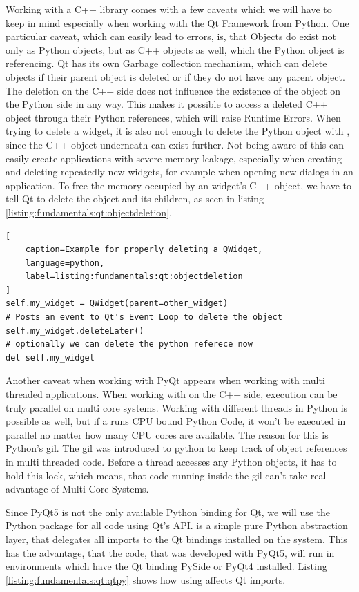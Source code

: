 Working with a C++ library comes with a few caveats which we will have to keep
in mind especially when working with the Qt Framework from Python. One
particular caveat, which can easily lead to errors, is, that Objects do exist
not only as Python objects, but as C++ objects as well, which the Python object
is referencing. Qt has its own Garbage collection mechanism, which can delete
objects if their parent object is deleted or if they do not have any parent
object. The deletion on the C++ side does not influence the existence of the
object on the Python side in any way. This makes it possible to access a deleted
C++ object through their Python references, which will raise Runtime Errors.
When trying to delete a widget, it is also not enough to delete the Python
object with , since the C++ object
underneath can exist further. Not being aware of this can easily create
applications with severe memory leakage, especially when creating and deleting
repeatedly new widgets, for example when opening new dialogs in an application.
To free the memory occupied by an widget's C++ object, we have to tell Qt to
delete the object and its children, as seen in listing
\ref{listing:fundamentals:qt:objectdeletion}.

\begin{lstlisting}[
    caption=Example for properly deleting a QWidget,
    language=python, 
    label=listing:fundamentals:qt:objectdeletion
]
self.my_widget = QWidget(parent=other_widget)
# Posts an event to Qt's Event Loop to delete the object
self.my_widget.deleteLater()
# optionally we can delete the python referece now
del self.my_widget
\end{lstlisting}

Another caveat when working with PyQt appears when working with multi threaded
applications. When working with  on the C++
side, execution can be truly parallel on multi core systems. Working with
different threads in Python is possible as well, but if a
 runs CPU bound Python Code, it won't be
executed in parallel no matter how many CPU cores are available. The reason for
this is Python's \gls{gil}. The \gls{gil} was introduced to python to keep track
of object references in multi threaded code. Before a thread accesses any Python
objects, it has to hold this lock, which means, that code running inside the
\gls{gil} can't take real advantage of Multi Core Systems.
\cite{PythonGil, PythonGilDocs}

Since PyQt5 is not the only available Python binding for Qt, we will use the
Python package  for all code using Qt's API.
 is a simple pure Python abstraction layer, that
delegates all imports to the Qt bindings installed on the system. This has the
advantage, that the code, that was developed with PyQt5, will run in
environments which have the Qt binding PySide or PyQt4 installed. Listing
\ref{listing:fundamentals:qt:qtpy} shows how using 
affects Qt imports.

